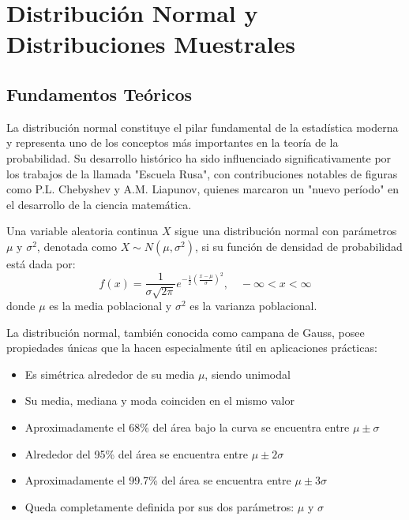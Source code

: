 \chapter{Distribución Normal y Distribuciones Muestrales}

\section{Fundamentos Teóricos}

La distribución normal constituye el pilar fundamental de la estadística moderna y representa uno de los conceptos más importantes en la teoría de la probabilidad. Su desarrollo histórico ha sido influenciado significativamente por los trabajos de la llamada "Escuela Rusa", con contribuciones notables de figuras como P.L. Chebyshev y A.M. Liapunov, quienes marcaron un "nuevo período" en el desarrollo de la ciencia matemática.

\begin{definition}
Una variable aleatoria continua $X$ sigue una distribución normal con parámetros $\mu$ y $\sigma^2$, denotada como $X \sim N(\mu, \sigma^2)$, si su función de densidad de probabilidad está dada por:
\begin{equation}
f(x) = \frac{1}{\sigma \sqrt{2\pi}} e^{-\frac{1}{2} \left(\frac{x - \mu}{\sigma}\right)^2}, \quad -\infty < x < \infty
\end{equation}
donde $\mu$ es la media poblacional y $\sigma^2$ es la varianza poblacional.
\end{definition}

\begin{remark}
La distribución normal, también conocida como campana de Gauss, posee propiedades únicas que la hacen especialmente útil en aplicaciones prácticas:
\begin{itemize}
    \item Es simétrica alrededor de su media $\mu$, siendo unimodal
    \item Su media, mediana y moda coinciden en el mismo valor
    \item Aproximadamente el 68\% del área bajo la curva se encuentra entre $\mu \pm \sigma$
    \item Alrededor del 95\% del área se encuentra entre $\mu \pm 2\sigma$
    \item Aproximadamente el 99.7\% del área se encuentra entre $\mu \pm 3\sigma$
    \item Queda completamente definida por sus dos parámetros: $\mu$ y $\sigma$
\end{itemize}
\end{remark}

